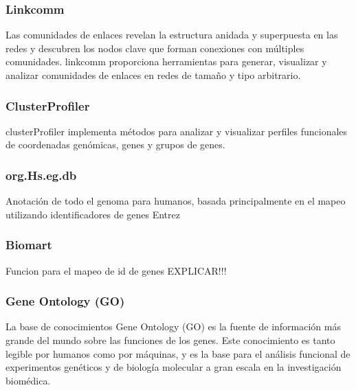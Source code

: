 \subsubsection{Linkcomm}

Las comunidades de enlaces revelan la estructura anidada y superpuesta en las redes y descubren los nodos clave que forman conexiones con múltiples comunidades. linkcomm \cite{Linkcomm_paper} proporciona herramientas para generar, visualizar y analizar comunidades de enlaces en redes de tamaño y tipo arbitrario.

\subsubsection{ClusterProfiler}

clusterProfiler \cite{ClusterProfiler_paper}implementa métodos para analizar y visualizar perfiles funcionales de coordenadas genómicas, genes y grupos de genes.

\subsubsection{org.Hs.eg.db} 

Anotación de todo el genoma para humanos, basada principalmente en el mapeo utilizando identificadores de genes Entrez

\subsubsection{Biomart}

Funcion para el mapeo de id de genes EXPLICAR!!!

\subsubsection{Gene Ontology (GO)}

La base de conocimientos Gene Ontology (GO) \cite{GO_doi} es la fuente de información más grande del mundo sobre las funciones de los genes. Este conocimiento es tanto legible por humanos como por máquinas, y es la base para el análisis funcional de experimentos genéticos y de biología molecular a gran escala en la investigación biomédica.






\hfill




\newpage